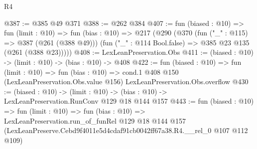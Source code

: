 \begin{lexlean}{R4}
\begin{coremodule}
@387 := @385 @49 @371
@388 := @262 @384
@407 := fun (biased : @10) =>
  fun (limit : @10) =>
  fun (bias : @10) =>
  @217
    (@290
      (@370
        (fun ("_" : @115) => @387 (@261 (@388 @49)))
        (fun ("_" : @114 Bool.false) => @385 @23 @135 (@261 (@388 @23)))))
@408 := LexLeanPreservation.Obs
@411 := (biased : @10) -> (limit : @10) -> (bias : @10) -> @408
@422 := fun (biased : @10) =>
  fun (limit : @10) =>
  fun (bias : @10) =>
  cond.{1} @408 @150 (LexLeanPreservation.Obs.value @156) LexLeanPreservation.Obs.overflow
@430 := (biased : @10) ->
  (limit : @10) -> (bias : @10) -> LexLeanPreservation.RunConv @129 @18 @144 @157
@443 := fun (biased : @10) =>
  fun (limit : @10) =>
  fun (bias : @10) =>
  LexLeanPreservation.run_of_funRel
    @129
    @18
    @144
    @157
    (LexLeanPreserve.Cebd9f4011e5d4cdaf91cb0042ff67a38.R4.__rel_0 @107 @112 @109)
\end{coremodule}
\end{lexlean}
